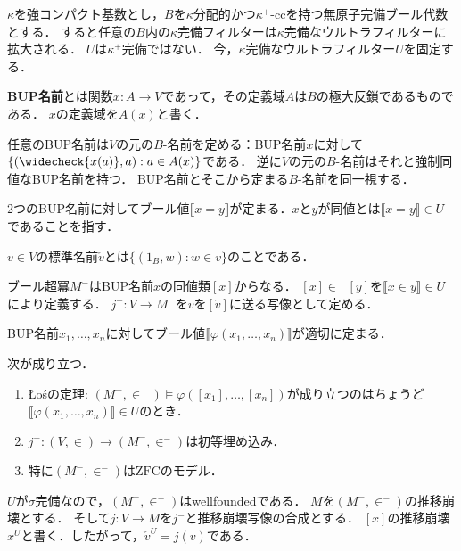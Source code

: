 \documentclass[uplatex,dvipdfmx]{jsarticle}
\newcommand{\ZFC}{\mathrm{ZFC}}
\newcommand{\truth}[1]{\llbracket #1 \rrbracket}
\renewcommand\emptyset{\varnothing}
\theoremstyle{definition}
\begin{document}
	$\kappa$を強コンパクト基数とし，$B$を$\kappa$分配的かつ$\kappa^+$-ccを持つ無原子完備ブール代数とする．
	すると任意の$B$内の$\kappa$完備フィルターは$\kappa$完備なウルトラフィルターに拡大される．
	$U$は$\kappa^+$完備ではない．
	今，$\kappa$完備なウルトラフィルター$U$を固定する．
	
	\textbf{BUP名前}とは関数$x \colon A \to V$であって，その定義域$A$は$B$の極大反鎖であるものである．
	$x$の定義域を$A(x)$と書く．
	
	任意のBUP名前は$V$の元の$B$-名前を定める：BUP名前$x$に対して$\{ (\widecheck{x(a)}, a) : a \in A(x) \}$である．
	逆に$V$の元の$B$-名前はそれと強制同値なBUP名前を持つ．
	BUP名前とそこから定まる$B$-名前を同一視する．
	
	2つのBUP名前に対してブール値$\truth{x=y}$が定まる．$x$と$y$が同値とは$\truth{x=y} \in U$であることを指す．
	
	$v \in V$の標準名前$\check{v}$とは$\{ (1_B, w) : w \in v \}$のことである．
	
	ブール超冪$M^-$はBUP名前$x$の同値類$[x]$からなる．
	$[x] \in^- [y]$を$\truth{x \in y} \in U$により定義する．
	$j^- \colon V \to M^-$を$v$を$[\check{v}]$に送る写像として定める．
	
	BUP名前$x_1, \dots, x_n$に対してブール値$\truth{\varphi(x_1, \dots, x_n)}$が適切に定まる．

	次が成り立つ．
	\begin{enumerate}
		\item Łośの定理: $(M^-, \in^-) \models \varphi([x_1], \dots, [x_n])$が成り立つのはちょうど$\truth{\varphi(x_1, \dots, x_n)} \in U$のとき．
		\item $j^- \colon (V, \in) \to (M^-, \in^-)$は初等埋め込み．
		\item 特に$(M^-, \in^-)$は$\ZFC$のモデル．
	\end{enumerate}
	
	$U$が$\sigma$完備なので，$(M^-, \in^-)$はwellfoundedである．
	$M$を$(M^-, \in^-)$の推移崩壊とする．
	そして$j \colon V \to M$を$j^-$と推移崩壊写像の合成とする．
	$[x]$の推移崩壊$x^U$と書く．したがって，$\check{v}^U = j(v)$である．
\end{document}
